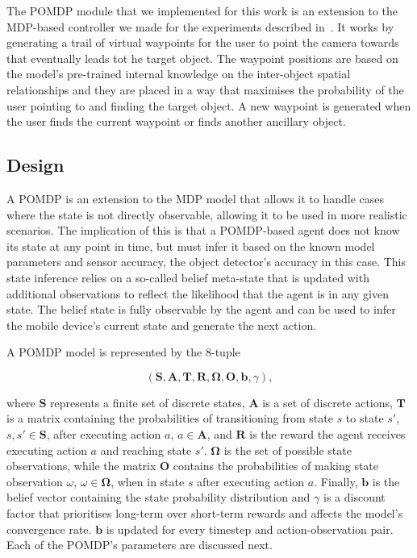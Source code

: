 \documentclass[runningheads]{llncs}
\begin{document}
The POMDP module that we implemented for this work is an extension to the MDP-based controller we made for the experiments described in~\cite{lock2019active}.
It works by generating a trail of virtual waypoints for the user to point the camera towards that eventually leads tot he target object.
The waypoint positions are based on the model's pre-trained internal knowledge on the inter-object spatial relationships and they are placed in a way that maximises the probability of the user pointing to and finding the target object.
A new waypoint is generated when the user finds the current waypoint or finds another ancillary object.

\subsection{Design}

A POMDP is an extension to the MDP model that allows it to handle cases where the state is not directly observable, allowing it to be used in more realistic scenarios. 
The implication of this is that a POMDP-based agent does not know its state at any point in time, but must infer it based on the known model parameters and sensor accuracy, the object detector's accuracy in this case.
This state inference relies on a so-called belief meta-state that is updated with additional observations to reflect the likelihood that the agent is in any given state.
The belief state is fully observable by the agent and can be used to infer the mobile device's current state and generate the next action.

A POMDP model is represented by the $8$-tuple

\begin{equation*}
  (\mathbf{S}, \mathbf{A}, \mathbf{T}, \mathbf{R}, \mathbf{\Omega}, \mathbf{O}, \mathbf{b}, \gamma),
\end{equation*}

\noindent where $\mathbf{S}$ represents a finite set of discrete states, $\mathbf{A}$ is a set of discrete actions, $\mathbf{T}$ is a matrix containing the probabilities of transitioning from state $s$ to state $s'$, $s, s' \in \mathbf{S}$, after executing action $a$, $a \in \mathbf{A}$, and $\mathbf{R}$ is the reward the agent receives executing action $a$ and reaching state $s'$.
$\mathbf{\Omega}$ is the set of possible state observations, while the matrix $\mathbf{O}$ contains the probabilities of making state observation $\omega$, $\omega \in \mathbf{\Omega}$, when in state $s$ after executing action $a$.
Finally, $\mathbf{b}$ is the belief vector containing the state probability distribution and $\gamma$ is a discount factor that prioritises long-term over short-term rewards and affects the model's convergence rate. 
$\mathbf{b}$ is updated for every timestep and action-observation pair.
Each of the POMDP's parameters are discussed next. 
\end{document}
